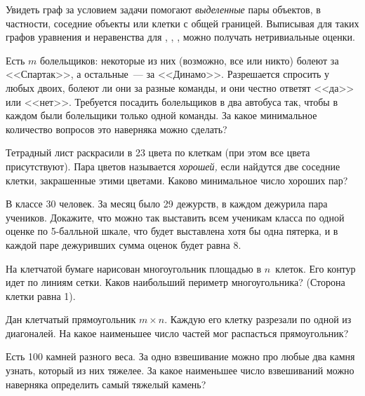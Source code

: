 Увидеть граф за условием задачи помогают \emph{выделенные} пары объектов,
в частности, соседние объекты или клетки с общей границей.
Выписывая для таких графов уравнения и неравенства для
, , , можно получать нетривиальные оценки.

\begin{problems}

\item
Есть $m$ болельщиков: некоторые из них (возможно, все или никто) болеют за
<<Спартак>>, а остальные~--- за <<Динамо>>.
Разрешается спросить у любых двоих, болеют ли они за разные команды, и они
честно ответят <<да>> или <<нет>>.
Требуется посадить болельщиков в два автобуса так, чтобы в каждом были
болельщики только одной команды.
За какое минимальное количество вопросов это наверняка можно сделать?

\item
Тетрадный лист раскрасили в 23 цвета по клеткам (при этом все цвета
присутствуют).
Пара цветов называется \emph{хорошей,} если найдутся две соседние клетки,
закрашенные этими цветами.
Каково минимальное число хороших пар?

\item
В классе 30 человек.
За месяц было 29 дежурств, в каждом дежурила пара учеников.
Докажите, что можно так выставить всем ученикам класса по одной оценке
по 5-балльной шкале, что будет выставлена хотя бы одна пятерка, и в каждой паре
дежуривших сумма оценок будет равна 8.

\item
На клетчатой бумаге нарисован многоугольник площадью в $n$~клеток.
Его контур идет по линиям сетки.
Каков наибольший периметр многоугольника?
(Сторона клетки равна 1).

\item
Дан клетчатый прямоугольник $m \times n$.
Каждую его клетку разрезали по одной из диагоналей.
На какое наименьшее число частей мог распасться прямоугольник?

\item
Есть 100 камней разного веса.
За одно взвешивание можно про любые два камня узнать, который из них тяжелее.
За какое наименьшее число взвешиваний можно наверняка определить самый тяжелый
камень?

\end{problems}

